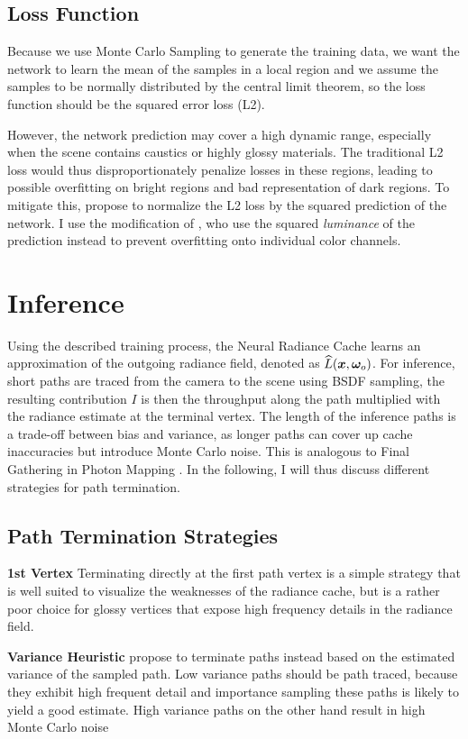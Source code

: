 \subsection{Loss Function}
Because we use Monte Carlo Sampling to generate the training data, we want the network to learn the mean of the samples in a local region and we assume the samples to be normally distributed by the central limit theorem, so the loss function should be the squared error loss (L2).

However, the network prediction may cover a high dynamic range, especially when the scene contains caustics or highly glossy materials.
The traditional L2 loss would thus disproportionately penalize losses in these regions, leading to possible overfitting on bright regions and bad representation of dark regions.
To mitigate this, \textcite{lehtinen2018} propose to normalize the L2 loss by the squared prediction of the network.
I use the modification of \textcite{muller2021}, who use the squared \emph{luminance} of the prediction instead to prevent overfitting onto individual color channels.

\section{Inference}
Using the described training process, the Neural Radiance Cache learns an approximation of the outgoing radiance field, denoted as $\widehat{L}(\bm{x}, \bm{\omega}_o)$.
For inference, short paths are traced from the camera to the scene using BSDF sampling, the resulting contribution $I$ is then the throughput along the path multiplied with the radiance estimate at the terminal vertex.
The length of the inference paths is a trade-off between bias and variance, as longer paths can cover up cache inaccuracies but introduce Monte Carlo noise.
This is analogous to Final Gathering in Photon Mapping .
In the following, I will thus discuss different strategies for path termination.

\subsection{Path Termination Strategies}
\textbf{1st Vertex} Terminating directly at the first path vertex is a simple strategy that is well suited to visualize the weaknesses of the radiance cache, but is a rather poor choice for glossy vertices that expose high frequency details in the radiance field.

\textbf{Variance Heuristic} \textcite{muller2021} propose to terminate paths instead based on the estimated variance of the sampled path.
Low variance paths should be path traced, because they exhibit high frequent detail and importance sampling these paths is likely to yield a good estimate.
High variance paths on the other hand result in high Monte Carlo noise


